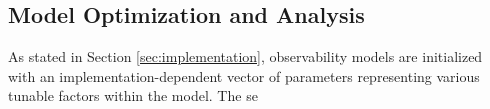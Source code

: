 \subsection{Model Optimization and Analysis}

As stated in Section \ref{sec:implementation}, observability models are initialized with an implementation-dependent vector of parameters representing various tunable factors within the model. The se

\subsubsection{}